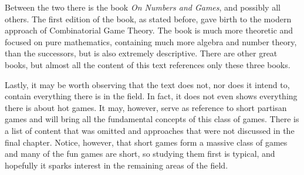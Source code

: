 Between the two there is the book \textit{On Numbers and Games}\cite{ONAG1}\cite{ONAG2}, and possibly all others. The first edition of the book, as stated before, gave birth to the modern approach of Combinatorial Game Theory. The book is much more theoretic and focused on pure mathematics, containing much more algebra and number theory, than the successors, but is also extremely descriptive. There are other great books, but almost all the content of this text references only these three books.

Lastly, it may be worth observing that the text does not, nor does it intend to, contain everything there is in the field. In fact, it does not even shows everything there is about hot games. It may, however, serve as reference to short partisan games and will bring all the fundamental concepts of this class of games. There is a list of content that was omitted and approaches that were not discussed in the final chapter. Notice, however, that short games form a massive class of games and many of the fun games are short, so studying them first is typical, and hopefully it sparks interest in the remaining areas of the field.













